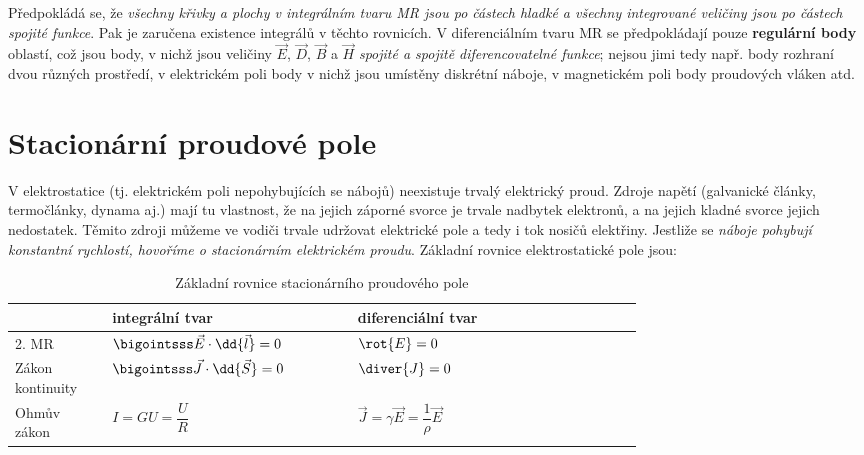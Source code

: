       Předpokládá se, že \emph{všechny křivky a plochy v integrálním tvaru MR jsou po částech
      hladké a všechny integrované veličiny jsou po částech spojité funkce}. Pak je zaručena
      existence integrálů v těchto rovnicích. V diferenciálním tvaru MR se předpokládají pouze
      \textbf{regulární body} oblastí, což jsou body, v nichž jsou veličiny $\vec{E}$, $\vec{D}$,
      $\vec{B}$ a $\vec{H}$ \emph{spojité a spojitě diferencovatelné funkce}; nejsou jimi tedy např.
      body rozhraní dvou různých prostředí, v elektrickém poli body v nichž jsou umístěny diskrétní
      náboje, v magnetickém poli body proudových vláken atd.

        
      
  \section{Stacionární proudové pole}
    V elektrostatice (tj. elektrickém poli nepohybujících se nábojů) neexistuje trvalý elektrický
    proud. Zdroje napětí (galvanické články, termočlánky, dynama aj.) mají tu vlastnost, že na
    jejich záporné svorce je trvale nadbytek elektronů, a na jejich kladné svorce jejich nedostatek.
    Těmito zdroji můžeme ve vodiči trvale udržovat elektrické pole a tedy i tok nosičů elektřiny.
    Jestliže se \emph{náboje pohybují konstantní rychlostí, hovoříme o stacionárním elektrickém
    proudu}. Základní rovnice elektrostatické pole jsou:

    \begin{table}[ht!]
      \centering
      \begin{tabular}{m{0.1\linewidth}|m{0.29\linewidth}|m{0.34\linewidth}|}
        \cline{2-3}
        \multicolumn{1}{l|}{} 
          & \textbf{integrální tvar} & \textbf{diferenciální tvar}                              \\
        \hline        
        \multicolumn{1}{|m{0.19\linewidth}|}{2. MR}         
          & \(\bigointsss\vec{E}\cdot \dd{\vec{l}} = 0\) & \(\rot{E} = 0\)                      \\ 
        \cline{1-3}       
        \hline        
        \multicolumn{1}{|m{0.19\linewidth}|}{Zákon kontinuity}        
          & \(\bigointsss\vec{J}\cdot \dd{\vec{S}}=0\) & \(\diver{J}=0\)                        \\
        \cline{1-3}       
        \multicolumn{1}{|m{0.19\linewidth}|}{Ohmův zákon}       
          & \(I=GU=\dfrac{U}{R}\) & \(\vec{J} = \gamma\vec{E} = \dfrac{1}{\rho}\vec{E}\)        \\
        \cline{1-3}
      \end{tabular}
      \caption{Základní rovnice stacionárního proudového pole}
    \end{table}
    
